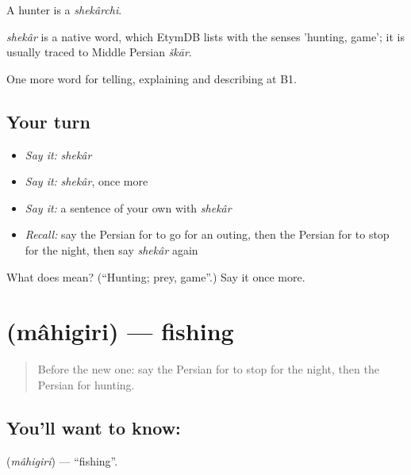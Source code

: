 A hunter is a \emph{shekârchi}.

\begin{cousinweb}
\emph{shekâr} is a native word, which EtymDB lists with the senses 'hunting, game'; it is usually traced to Middle Persian \emph{škār}.
\end{cousinweb}

\begin{grammarlens}[title={What you've built}]
One more word for telling, explaining and describing at B1.
\end{grammarlens}

\subsection*{Your turn}
\begin{itemize}
\raggedright
  \item \emph{Say it:} \emph{shekâr}
  \item \emph{Say it:} \emph{shekâr}, once more
  \item \emph{Say it:} a sentence of your own with \emph{shekâr}
  \item \emph{Recall:} say the Persian for to go for an outing, then the Persian for to stop for the night, then say \emph{shekâr} again
\end{itemize}

\begin{tcolorbox}[breakable,colback=teal!4,colframe=teal!35!black,title={Before you move on}]
What does  mean? (\textquotedblleft{}Hunting; prey, game\textquotedblright{}.) Say it once more.
\end{tcolorbox}
\section[\texorpdfstring{\fa{ماهیگیری} (mâhigiri)}{ماهیگیری (mâhigiri)}]{ (mâhigiri) — fishing}

\label{lesson:FA-C471-mahigiri}



\begin{quote}
Before the new one: say the Persian for to stop for the night, then the Persian for hunting.
\end{quote}

\subsection*{You'll want to know: }
\textbf{} (\emph{mâhigiri}) — \textquotedblleft{}fishing\textquotedblright{}.

